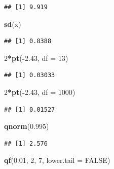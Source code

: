 \documentclass[11pt,]{krantz}
\makeatletter
\newenvironment{Shaded}{\begin{snugshade}}{\end{snugshade}}
\newcommand{\KeywordTok}[1]{\textcolor[rgb]{0.13,0.29,0.53}{\textbf{#1}}}
\newcommand{\DataTypeTok}[1]{\textcolor[rgb]{0.13,0.29,0.53}{#1}}
\newcommand{\DecValTok}[1]{\textcolor[rgb]{0.00,0.00,0.81}{#1}}
\newcommand{\FloatTok}[1]{\textcolor[rgb]{0.00,0.00,0.81}{#1}}
\newcommand{\OtherTok}[1]{\textcolor[rgb]{0.56,0.35,0.01}{#1}}
\newcommand{\OperatorTok}[1]{\textcolor[rgb]{0.81,0.36,0.00}{\textbf{#1}}}
\newcommand{\NormalTok}[1]{#1}
\newenvironment{kframe}{%
\medskip{}
\setlength{\fboxsep}{.8em}
 \def\at@end@of@kframe{}%
 \ifinner\ifhmode%
  \def\at@end@of@kframe{\end{minipage}}%
  \begin{minipage}{\columnwidth}%
 \fi\fi%
 \def\FrameCommand##1{\hskip\@totalleftmargin \hskip-\fboxsep
 \colorbox{shadecolor}{##1}\hskip-\fboxsep
     \hskip-\linewidth \hskip-\@totalleftmargin \hskip\columnwidth}%
 \MakeFramed {\advance\hsize-\width
   \@totalleftmargin\z@ \linewidth\hsize
   \@setminipage}}%
 {\par\unskip\endMakeFramed%
 \at@end@of@kframe}
\renewenvironment{Shaded}{\begin{kframe}}{\end{kframe}}
\theoremstyle{definition}
\theoremstyle{definition}
\theoremstyle{remark}
\makeatother
\begin{document}
\begin{verbatim}
## [1] 9.919
\end{verbatim}

\begin{Shaded}
\begin{Highlighting}[]
\KeywordTok{sd}\NormalTok{(x)}
\end{Highlighting}
\end{Shaded}

\begin{verbatim}
## [1] 0.8388
\end{verbatim}

\begin{Shaded}
\begin{Highlighting}[]
\DecValTok{2}\OperatorTok{*}\KeywordTok{pt}\NormalTok{(}\OperatorTok{-}\FloatTok{2.43}\NormalTok{, }\DataTypeTok{df =} \DecValTok{13}\NormalTok{)}
\end{Highlighting}
\end{Shaded}

\begin{verbatim}
## [1] 0.03033
\end{verbatim}

\begin{Shaded}
\begin{Highlighting}[]
\DecValTok{2}\OperatorTok{*}\KeywordTok{pt}\NormalTok{(}\OperatorTok{-}\FloatTok{2.43}\NormalTok{, }\DataTypeTok{df =} \DecValTok{1000}\NormalTok{)}
\end{Highlighting}
\end{Shaded}

\begin{verbatim}
## [1] 0.01527
\end{verbatim}

\begin{Shaded}
\begin{Highlighting}[]
\KeywordTok{qnorm}\NormalTok{(}\FloatTok{0.995}\NormalTok{)}
\end{Highlighting}
\end{Shaded}

\begin{verbatim}
## [1] 2.576
\end{verbatim}

\begin{Shaded}
\begin{Highlighting}[]
\KeywordTok{qf}\NormalTok{(}\FloatTok{0.01}\NormalTok{, }\DecValTok{2}\NormalTok{, }\DecValTok{7}\NormalTok{, }\DataTypeTok{lower.tail =} \OtherTok{FALSE}\NormalTok{)}
\end{Highlighting}
\end{Shaded}
\end{document}
